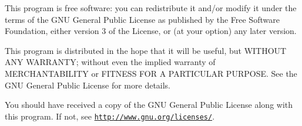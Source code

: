 This program is free software\+: you can redistribute it and/or modify it under the terms of the G\+NU General Public License as published by the Free Software Foundation, either version 3 of the License, or (at your option) any later version.

This program is distributed in the hope that it will be useful, but W\+I\+T\+H\+O\+UT A\+NY W\+A\+R\+R\+A\+N\+TY; without even the implied warranty of M\+E\+R\+C\+H\+A\+N\+T\+A\+B\+I\+L\+I\+TY or F\+I\+T\+N\+E\+SS F\+OR A P\+A\+R\+T\+I\+C\+U\+L\+AR P\+U\+R\+P\+O\+SE. See the G\+NU General Public License for more details.

You should have received a copy of the G\+NU General Public License along with this program. If not, see \href{http://www.gnu.org/licenses/}{\tt http\+://www.\+gnu.\+org/licenses/}. 